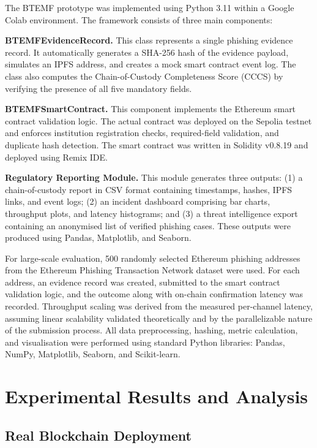 \documentclass[conference]{IEEEtran}
\begin{document}
The BTEMF prototype was implemented using Python 3.11 within a Google Colab environment. The framework consists of three main components:

\textbf{BTEMFEvidenceRecord.} This class represents a single phishing evidence record. It automatically generates a SHA-256 hash of the evidence payload, simulates an IPFS address, and creates a mock smart contract event log. The class also computes the Chain-of-Custody Completeness Score (CCCS) by verifying the presence of all five mandatory fields.

\textbf{BTEMFSmartContract.} This component implements the Ethereum smart contract validation logic. The actual contract was deployed on the Sepolia testnet and enforces institution registration checks, required-field validation, and duplicate hash detection. The smart contract was written in Solidity v0.8.19 and deployed using Remix IDE.

\textbf{Regulatory Reporting Module.} This module generates three outputs: (1) a chain-of-custody report in CSV format containing timestamps, hashes, IPFS links, and event logs; (2) an incident dashboard comprising bar charts, throughput plots, and latency histograms; and (3) a threat intelligence export containing an anonymised list of verified phishing cases. These outputs were produced using Pandas, Matplotlib, and Seaborn.

For large-scale evaluation, 500 randomly selected Ethereum phishing addresses from the Ethereum Phishing Transaction Network dataset were used. For each address, an evidence record was created, submitted to the smart contract validation logic, and the outcome along with on-chain confirmation latency was recorded. Throughput scaling was derived from the measured per-channel latency, assuming linear scalability validated theoretically and by the parallelizable nature of the submission process. All data preprocessing, hashing, metric calculation, and visualisation were performed using standard Python libraries: Pandas, NumPy, Matplotlib, Seaborn, and Scikit-learn.

\section{Experimental Results and Analysis}

\subsection{Real Blockchain Deployment}
\end{document}
